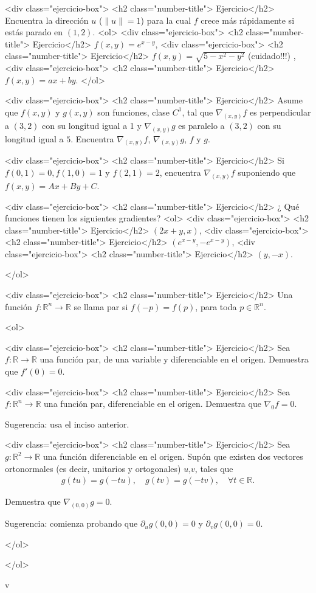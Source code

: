 \documentclass{article}
\theoremstyle{definition}
\begin{document}
<div class="ejercicio-box"> <h2 class="number-title"> Ejercicio</h2> Encuentra la dirección $u$ ($\|u\|=1$) para la cual $f$ crece más rápidamente
  si estás parado en $(1,2)$.
  <ol>
  <div class="ejercicio-box"> <h2 class="number-title"> Ejercicio</h2> $f(x,y)=e^{x-y}$,
  <div class="ejercicio-box"> <h2 class="number-title"> Ejercicio</h2> $f(x,y)=\sqrt{5-x^2-y^2}$ (cuidado!!!) ,
  <div class="ejercicio-box"> <h2 class="number-title"> Ejercicio</h2> $f(x,y)=ax+by$.
  </ol>


<div class="ejercicio-box"> <h2 class="number-title"> Ejercicio</h2> Asume que $f(x,y)$ y $g(x,y)$ son   funciones, clase $C^1$, tal que
  $\nabla_{(x,y)} f$ es perpendicular a $(3,2)$ con su longitud
  igual a 1 y $\nabla_{(x,y)}g$ es paralelo a $(3,2)$
  con su longitud igual a $5$. Encuentra $\nabla_{(x,y)}f$,
  $\nabla_{(x,y)}g$, $f$ y $g$.

<div class="ejercicio-box"> <h2 class="number-title"> Ejercicio</h2> Si $f(0,1)=0, f(1,0)=1$ y $f(2,1)=2$, encuentra
  $\nabla_{(x,y)}f$ suponiendo que $f(x,y)=Ax+By+C$.

<div class="ejercicio-box"> <h2 class="number-title"> Ejercicio</h2> ¿ Qué funciones tienen los siguientes
  gradientes?
  <ol>
  <div class="ejercicio-box"> <h2 class="number-title"> Ejercicio</h2> $(2x+y,x)$,
  <div class="ejercicio-box"> <h2 class="number-title"> Ejercicio</h2> $(e^{x-y},-e^{x-y})$,
  <div class="ejercicio-box"> <h2 class="number-title"> Ejercicio</h2> $(y,-x)$.
    
  </ol>
  


         <div class="ejercicio-box"> <h2 class="number-title"> Ejercicio</h2> Una función $f:\mathbb{R}^n \to \mathbb{R}$ se llama par si
           $f(-p)=f(p)$, para toda $p\in \mathbb{R}^n$.

           <ol>
         
           <div class="ejercicio-box"> <h2 class="number-title"> Ejercicio</h2> Sea $f:\mathbb{R} \to \mathbb{R}$ una función par, de una variable
             y diferenciable en el origen. Demuestra que $f'(0)=0$. 


           <div class="ejercicio-box"> <h2 class="number-title"> Ejercicio</h2> Sea $f:\mathbb{R}^n \to \mathbb{R}$ una función par,
             diferenciable en el origen. Demuestra que $\nabla_{0}f=0$.

             Sugerencia: usa el inciso anterior.
             
           <div class="ejercicio-box"> <h2 class="number-title"> Ejercicio</h2> Sea $g:\mathbb{R}^2\to \mathbb{R}$ una función diferenciable en
             el origen. Supón que existen dos vectores ortonormales (es decir,
             unitarios y ortogonales) $u$,$v$, tales que
             \begin{eqnarray*}
               g(tu)=g(-tu), \quad g(tv)=g(-tv),\quad \forall t\in \mathbb{R}. 
             \end{eqnarray*}

             Demuestra que $\nabla_{(0,0)}g=0$.
             
             Sugerencia: comienza probando que   $\partial_ug(0,0)=0$ y $\partial_{v}g(0,0)=0$. 

           </ol>

  
  </ol>


v  
       
\end{document}
